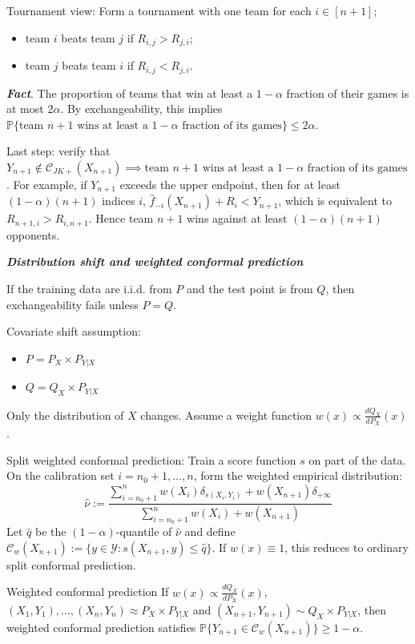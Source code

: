 Tournament view: Form a tournament with one team for each $i \in [n+1]$;
\begin{itemize}
    \item team $i$ beats team $j$ if $R_{i,j} > R_{j,i}$;
    \item team $j$ beats team $i$ if $R_{i,j} < R_{j,i}$.
\end{itemize}
\emph{\textbf{Fact}}. The proportion of teams that win at least a $1-\alpha$ fraction of their games is at most $2\alpha$.
By exchangeability, this implies $\mathbb{P}\{\text{team } n+1 \text{ wins at least a } 1-\alpha \text{ fraction of its games}\} \le 2\alpha$.

Last step: verify that $Y_{n+1} \notin \mathcal{C}_{JK+}(X_{n+1}) \implies \text{team } n+1 \text{ wins at least a } 1-\alpha \text{ fraction of its games}$.
For example, if $Y_{n+1}$ exceeds the upper endpoint, then for at least $(1-\alpha)(n+1)$ indices $i$, $\hat{f}_{-i}(X_{n+1}) + R_i < Y_{n+1}$, which is equivalent to $R_{n+1,i} > R_{i,n+1}$. Hence team $n+1$ wins against at least $(1-\alpha)(n+1)$ opponents.

\emph{\textbf{Distribution shift and weighted conformal prediction}}


If the training data are i.i.d. from $P$ and the test point is from $Q$, then exchangeability fails unless $P=Q$.

Covariate shift assumption:
\begin{itemize}
    \item $P = P_X \times P_{Y|X}$
    \item $Q = Q_X \times P_{Y|X}$
\end{itemize}
Only the distribution of $X$ changes. Assume a weight function $w(x) \propto \frac{dQ_X}{dP_X}(x)$.

Split weighted conformal prediction: Train a score function $s$ on part of the data. On the calibration set $i=n_0+1, \dots, n$, form the weighted empirical distribution:
\[ \hat{\nu} := \frac{\sum_{i=n_0+1}^n w(X_i)\delta_{s(X_i, Y_i)} + w(X_{n+1})\delta_{+\infty}}{\sum_{i=n_0+1}^n w(X_i) + w(X_{n+1})} \]
Let $\hat{q}$ be the $(1-\alpha)$-quantile of $\hat{\nu}$ and define $\mathcal{C}_w(X_{n+1}) := \{y \in \mathcal{Y} : s(X_{n+1}, y) \le \hat{q}\}$.
If $w(x) \equiv 1$, this reduces to ordinary split conformal prediction.

\begin{thm}{Weighted conformal prediction}{}
If $w(x) \propto \frac{dQ_X}{dP_X}(x)$, $(X_1, Y_1), \dots, (X_n, Y_n) \approx P_X \times P_{Y|X}$ and $(X_{n+1}, Y_{n+1}) \sim Q_X \times P_{Y|X}$, then weighted conformal prediction satisfies $\mathbb{P}\{Y_{n+1} \in \mathcal{C}_w(X_{n+1})\} \ge 1-\alpha$.
\end{thm}

